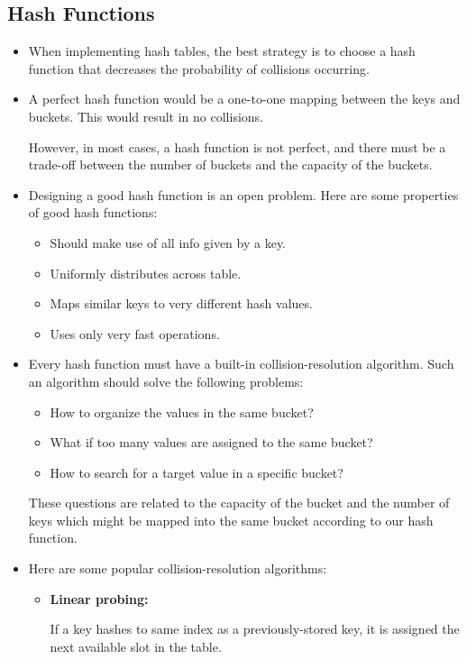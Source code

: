 \documentclass[12pt]{article}
\newcommand{\bb}[1]{\textbf{#1}}
\newcommand{\vsp}{\vspace{0.75mm}}
\begin{document}
	\subsection*{Hash Functions}
	\begin{itemize}[topsep=0mm,itemsep=0mm,listparindent=6mm]
		\item When implementing hash tables, the best strategy is to choose a hash function that decreases the probability of collisions occurring. 
		\item A perfect hash function would be a one-to-one mapping between the keys and buckets. This would result in no collisions.
		
		However, in most cases, a hash function is not perfect, and there must be a trade-off between the number of buckets and the capacity of the buckets.
		\item Designing a good hash function is an open problem. Here are some properties of good hash functions:
		\begin{itemize}[topsep=0mm]
			\item Should make use of all info given by a key.
			\item Uniformly distributes across table.
			\item Maps similar keys to very different hash values.
			\item Uses only very fast operations.
		\end{itemize}
		\item Every hash function must have a built-in collision-resolution algorithm. Such an algorithm should solve the following problems:
		\begin{itemize}[topsep=0mm]
			\item How to organize the values in the same bucket?
			\item What if too many values are assigned to the same bucket?
			\item How to search for a target value in a specific bucket?
		\end{itemize}
		These questions are related to the capacity of the bucket and the number of keys which might be mapped into the same bucket according to our hash function.
		
		\item Here are some popular collision-resolution algorithms:
		\begin{itemize}[topsep=0mm,itemsep=3mm]
			\item \bb{Linear probing:} 
			
			If a key hashes to same index as a previously-stored key, it is assigned the next available slot in the table.\vsp
			

\end{itemize}
\end{itemize}
\end{document}
